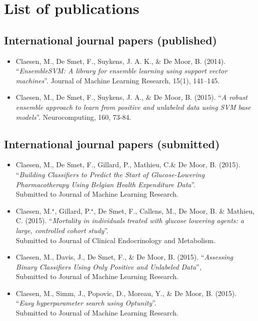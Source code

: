 \chapter{List of publications}

\section*{International journal papers (published)}

\begin{itemize}
\item Claesen, M., De Smet, F., Suykens, J. A. K., \& De Moor, B. (2014). ``\emph{EnsembleSVM: A library for ensemble learning using support vector machines}''. Journal of Machine Learning Research, 15(1), 141--145.
\item Claesen, M., De Smet, F., Suykens, J. A., \& De Moor, B. (2015). ``\emph{A robust ensemble approach to learn from positive and unlabeled data using SVM base models}''.
Neurocomputing, 160, 73-84.
\end{itemize}

\section*{International journal papers (submitted)}
\begin{itemize}
\item Claesen, M., De Smet, F., Gillard, P., Mathieu, C.\& De Moor, B. (2015). ``\emph{Building Classifiers to Predict the Start of Glucose-Lowering Pharmacotherapy Using Belgian Health Expenditure Data}''. \\ 
        Submitted to Journal of Machine Learning Research.
\item Claesen, M.$^\star$, Gillard, P.$^\star$, De Smet, F., Callens, M., De Moor, B. \& Mathieu, C. (2015). ``\emph{Mortality in individuals treated with glucose lowering agents: a large, controlled cohort study}''. \\ 
        Submitted to Journal of Clinical Endocrinology and Metabolism.
\item Claesen, M., Davis, J., De Smet, F., \& De Moor, B. (2015). ``\emph{Assessing Binary Classifiers Using Only Positive and Unlabeled Data}'', \\
        Submitted to Journal of Machine Learning Research.
\item Claesen, M., Simm, J., Popovic, D., Moreau, Y., \& De Moor, B. (2015). ``\emph{Easy hyperparameter search using Optunity}''. \\
        Submitted to Journal of Machine Learning Research.
\end{itemize}

